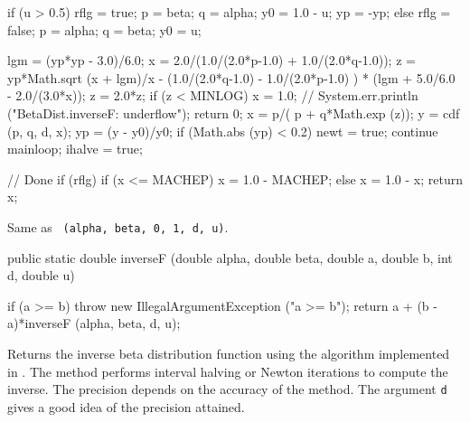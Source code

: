 \begin{code}
\begin{hide}
{{         if (u > 0.5) {
            rflg = true;
            p = beta;
            q = alpha;
            y0 = 1.0 - u;
            yp = -yp;
         }
         else {
            rflg = false;
            p = alpha;
            q = beta;
            y0 = u;
         }

         lgm = (yp*yp - 3.0)/6.0;
         x = 2.0/(1.0/(2.0*p-1.0)  +  1.0/(2.0*q-1.0));
         z = yp*Math.sqrt (x + lgm)/x
           - (1.0/(2.0*q-1.0) - 1.0/(2.0*p-1.0) )
           * (lgm + 5.0/6.0 - 2.0/(3.0*x));
         z = 2.0*z;
         if (z < MINLOG) {
            x = 1.0;
            // System.err.println ("BetaDist.inverseF: underflow");
            return 0;
         }
         x = p/( p + q*Math.exp (z));
         y = cdf (p, q, d, x);
         yp = (y - y0)/y0;
         if (Math.abs (yp) < 0.2) {
            newt = true;
            continue mainloop;
         }
         ihalve = true;
      }

      // Done
      if (rflg) {
         if (x <= MACHEP)
            x = 1.0 - MACHEP;
         else
            x = 1.0 - x;
      }
      return x;
   }\end{hide}
\end{code}
\begin{tabb}   Same as
 ~\texttt{(alpha, beta, 0, 1, d, u)}.
\end{tabb}
\begin{code}

   public static double inverseF (double alpha, double beta,
                                  double a, double b, int d, double u)\begin{hide} {
      if (a >= b)
        throw new IllegalArgumentException ("a >= b");
      return a + (b - a)*inverseF (alpha, beta, d, u);
   }\end{hide}
\end{code}
\begin{tabb}   Returns the inverse beta distribution function
  using the algorithm implemented in
  .
   The method performs interval halving or Newton iterations to
   compute the inverse.  The precision depends on the
   accuracy of the  method.  The argument \texttt{d} gives
   a good idea of the precision attained.
\end{tabb}
